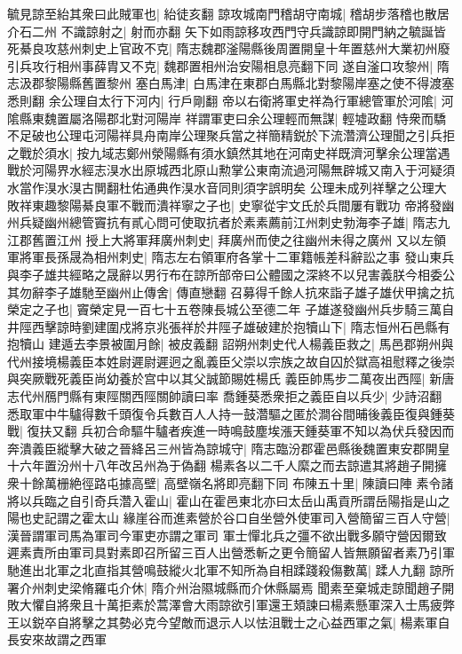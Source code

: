 毓見諒至紿其衆曰此賊軍也|{
	紿徒亥翻}
諒攻城南門稽胡守南城|{
	稽胡步落稽也散居介石二州}
不識諒射之|{
	射而亦翻}
矢下如雨諒移攻西門守兵識諒即開門納之毓誕皆死綦良攻慈州刺史上官政不克|{
	隋志魏郡滏陽縣後周置開皇十年置慈州大業初州廢}
引兵攻行相州事薛胄又不克|{
	魏郡置相州治安陽相息亮翻下同}
遂自滏口攻黎州|{
	隋志汲郡黎陽縣舊置黎州}
塞白馬津|{
	白馬津在東郡白馬縣北對黎陽岸塞之使不得渡塞悉則翻}
余公理自太行下河内|{
	行戶剛翻}
帝以右衛將軍史祥為行軍總管軍於河隂|{
	河隂縣東魏置屬洛陽郡北對河陽岸}
祥謂軍吏曰余公理輕而無謀|{
	輕墟政翻}
恃衆而驕不足破也公理屯河陽祥具舟南岸公理聚兵當之祥簡精鋭於下流濳濟公理聞之引兵拒之戰於須水|{
	按九域志鄭州滎陽縣有須水鎮然其地在河南史祥既濟河擊余公理當遇戰於河陽界水經志湨水出原城西北原山勲掌公東南流過河陽無辟城又南入于河疑須水當作湨水湨古閴翻杜佑通典作湨水音同則須字誤明矣}
公理未成列祥擊之公理大敗祥東趣黎陽綦良軍不戰而潰祥寧之子也|{
	史寧從宇文氏於兵間屢有戰功}
帝將發幽州兵疑幽州總管竇抗有貳心問可使取抗者於素素薦前江州刺史勃海李子雄|{
	隋志九江郡舊置江州}
授上大將軍拜廣州刺史|{
	拜廣州而使之往幽州未得之廣州}
又以左領軍將軍長孫晟為相州刺史|{
	隋志左右領軍府各掌十二軍籍帳差科辭訟之事}
發山東兵與李子雄共經略之晟辭以男行布在諒所部帝曰公體國之深終不以兒害義朕今相委公其勿辭李子雄馳至幽州止傳舍|{
	傳直戀翻}
召募得千餘人抗來詣子雄子雄伏甲擒之抗榮定之子也|{
	竇榮定見一百七十五卷陳長城公至德二年}
子雄遂發幽州兵步騎三萬自井陘西擊諒時劉建圍戍將京兆張祥於井陘子雄破建於抱犢山下|{
	隋志恒州石邑縣有抱犢山}
建遁去李景被圍月餘|{
	被皮義翻}
詔朔州刺史代人楊義臣救之|{
	馬邑郡朔州與代州接境楊義臣本姓尉遲尉遲迥之亂義臣父崇以宗族之故自囚於獄高祖慰釋之後崇與突厥戰死義臣尚幼養於宫中以其父誠節賜姓楊氏}
義臣帥馬步二萬夜出西陘|{
	新唐志代州鴈門縣有東陘關西陘關帥讀曰率}
喬鍾葵悉衆拒之義臣自以兵少|{
	少詩沼翻}
悉取軍中牛驢得數千頭復令兵數百人人持一鼓濳驅之匿於澗谷間晡後義臣復與鍾葵戰|{
	復扶又翻}
兵初合命驅牛驢者疾進一時鳴鼓塵埃漲天鍾葵軍不知以為伏兵發因而奔潰義臣縱擊大破之晉絳呂三州皆為諒城守|{
	隋志臨汾郡霍邑縣後魏置東安郡開皇十六年置汾州十八年改呂州為于偽翻}
楊素各以二千人縻之而去諒遣其將趙子開擁衆十餘萬栅絶徑路屯據高壁|{
	高壁嶺名將即亮翻下同}
布陳五十里|{
	陳讀曰陣}
素令諸將以兵臨之自引奇兵濳入霍山|{
	霍山在霍邑東北亦曰太岳山禹貢所謂岳陽指是山之陽也史記謂之霍太山}
緣崖谷而進素營於谷口自坐營外使軍司入營簡留三百人守營|{
	漢晉謂軍司馬為軍司今軍吏亦謂之軍司}
軍士憚北兵之彊不欲出戰多願守營因爾致遲素責所由軍司具對素即召所留三百人出營悉斬之更令簡留人皆無願留者素乃引軍馳進出北軍之北直指其營鳴鼓縱火北軍不知所為自相蹂踐殺傷數萬|{
	蹂人九翻}
諒所署介州刺史梁脩羅屯介休|{
	隋介州治隰城縣而介休縣屬焉}
聞素至棄城走諒聞趙子開敗大懼自將衆且十萬拒素於蒿澤會大雨諒欲引軍還王頍諫曰楊素懸軍深入士馬疲弊王以鋭卒自將擊之其勢必克今望敵而退示人以怯沮戰士之心益西軍之氣|{
	楊素軍自長安來故謂之西軍}
